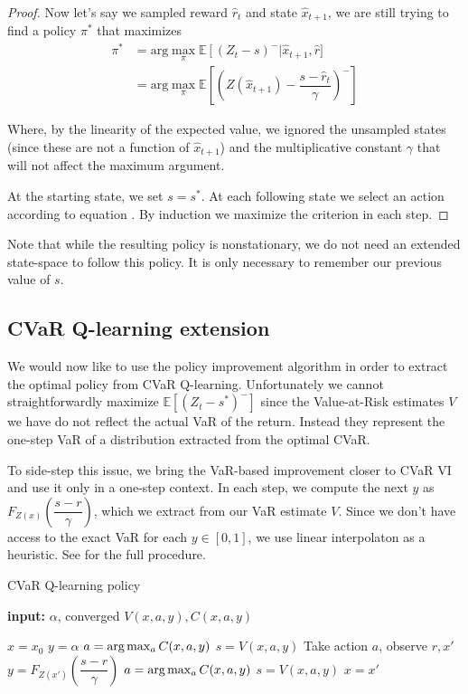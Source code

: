 \begin{proof}
Now let's say we sampled reward $\hat{r}_t$ and state $\hat{x}_{t+1}$, we are still trying to find a policy $\pi^*$ that maximizes 
\begin{equation}\label{eqn:sampled x_t+1}
\begin{split}
\pi^* &=\text{arg}\max_\pi \mathbb{E}\left[(Z_t-s)^-\right | \hat{x}_{t+1}, \hat{r}]\\
&= \text{arg}\max_\pi \mathbb{E}\left[\left(Z(\hat{x}_{t+1}) - \dfrac{s - \hat{r}_t}{\gamma}\right)^-\right]
\end{split}
\end{equation}

Where, by the linearity of the expected value, we ignored the unsampled states (since these are not a function of $\hat{x}_{t+1}$) and the multiplicative constant $\gamma$ that will not affect the maximum argument.

At the starting state, we set $s=s^*$. At each following state we select an action according to equation . By induction we maximize the criterion  in each step.
\end{proof}

Note that while the resulting policy is nonstationary, we do not need an extended state-space to follow this policy. It is only necessary to remember our previous value of $s$.

\subsection{CVaR Q-learning extension}
We would now like to use the policy improvement algorithm in order to extract the optimal policy from CVaR Q-learning. Unfortunately we cannot straightforwardly maximize $\mathbb{E}\left[(Z_t-s^*)^-\right]$ since the Value-at-Risk estimates $V$ we have do not reflect the actual VaR of the return. Instead they represent the one-step VaR of a distribution extracted from the optimal CVaR.

To side-step this issue, we bring the VaR-based improvement closer to CVaR VI and use it only in a one-step context. In each step, we compute the next $y$ as $F_{Z(x)}(\dfrac{s-r}{\gamma})$, which we extract from our VaR estimate $V$. Since we don't have access to the exact VaR for each $y \in [0,1]$, we use linear interpolaton as a heuristic. See  for the full procedure.


\begin{algorithm}
\caption{CVaR Q-learning policy}\label{alg:varxibasedpolicy}
\begin{algorithmic}
    \STATE \textbf{input:} $\alpha$, converged $V(x, a, y), C(x, a, y)$
    		
	\STATE $x = x_0$
	\STATE $y = \alpha$
	\STATE $a = \text{arg}\max_a C(x, a, y)$
	\STATE $s = V(x, a, y)$
	\STATE Take action $a$, observe $r, x'$
	\STATE $y = F_{Z(x')}(\dfrac{s-r}{\gamma})$
	\STATE $a = \text{arg}\max_a C(x, a, y)$
	\STATE $s = V(x, a, y)$
	\STATE $x = x'$
	\ENDWHILE
\end{algorithmic}
\end{algorithm}

